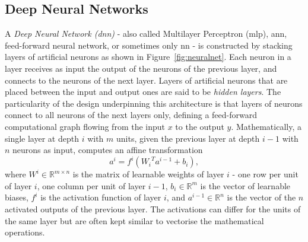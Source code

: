 \subsection{Deep Neural Networks}
A \textit{Deep Neural Network (\gls{dnn})} - also called Multilayer Perceptron (\gls{mlp}), \gls{ann}, feed-forward neural network, or sometimes only \gls{nn} - is constructed by stacking layers of artificial neurons as shown in Figure~\ref{fig:neuralnet}. Each neuron in a layer receives as input the output of the neurons of the previous layer, and connects to the neurons of the next layer. Layers of artificial neurons that are placed between the input and output ones are said to be \textit{hidden layers}. The particularity of the design underpinning this architecture is that layers of neurons connect to all neurons of the next layers only, defining a feed-forward computational graph flowing from the input $x$ to the output $y$. Mathematically, a single layer at depth $i$ with $m$ units, given the previous layer at depth $i-1$ with $n$ neurons as input, computes an affine transformation
\begin{equation}\label{eq:feedforward}
    a^i = f^i\left({W_i}^T a^{i-1} + b_i\right),
\end{equation}
where $W^i \in \mathbb{R}^{m \times n}$ is the matrix of learnable weights of layer $i$ - one row per unit of layer $i$, one column per unit of layer $i-1$, $b_i \in \mathbb{R}^m$ is the vector of learnable biases, $f^i$ is the activation function of layer $i$, and $a^{i-1} \in \mathbb{R}^n$ is the vector of the $n$ activated outputs of the previous layer. The activations can differ for the units of the same layer but are often kept similar to vectorise the mathematical operations. 

